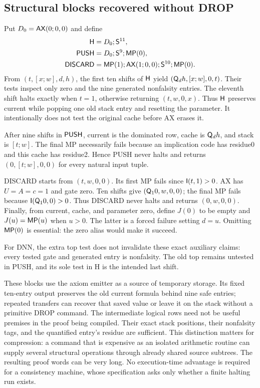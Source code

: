 \subsection{Structural blocks recovered without DROP}

Put $D_0=\mathsf{AX}(0;0,0)$ and define
\begin{align*}
 \mathsf H&=D_0;\mathsf S^{11},\\
 \mathsf{PUSH}&=D_0;\mathsf S^9;\mathsf{MP}(0),\\
 \mathsf{DISCARD}&=\mathsf{MP}(1);\mathsf{AX}(1;0,0);\mathsf S^{10};\mathsf{MP}(0).
\end{align*}
From $(t,[x;w],d,h)$, the first ten shifts of $\mathsf H$ yield
$(\mathsf Q_dh,[x;w],0,t)$. Their tests inspect only zero and the nine
generated nonfalsity entries. The eleventh shift halts exactly when
$t=1$, otherwise returning $(t,w,0,x)$. Thus $\mathsf H$ preserves
current while popping one old stack entry and resetting the parameter.
It intentionally does not test the original cache before AX erases it.

After nine shifts in $\mathsf{PUSH}$, current is the dominated row,
cache is $\mathsf Q_dh$, and stack is $[t;w]$. The final MP necessarily
fails because an implication code has residue0 and this cache has
residue2. Hence PUSH never halts and returns $(0,[t;w],0,0)$ for
every natural input tuple.

DISCARD starts from $(t,w,0,0)$. Its first MP fails since
$\mathsf I(t,1)>0$. AX has $U=A=c=1$ and gate zero. Ten shifts give
$(\mathsf Q_1 0,w,0,0)$; the final MP fails because
$\mathsf I(\mathsf Q_1 0,0)>0$. Thus DISCARD never halts and returns
$(0,w,0,0)$. Finally, from current, cache, and parameter zero, define
$J(0)$ to be empty and $J(u)=\mathsf{MP}(u)$ when $u>0$. The latter is
a forced failure setting $d=u$. Omitting $\mathsf{MP}(0)$ is essential:
the zero alias would make it succeed.

For DNN, the extra top test does not invalidate these exact auxiliary
claims: every tested gate and generated entry is nonfalsity. The old
top remains untested in PUSH, and its sole test in H is the intended
last shift.

These blocks use the axiom emitter as a source of temporary storage.
Its fixed ten-entry output preserves the old current formula behind nine
safe entries; repeated transfers can recover that saved value or leave
it on the stack without a primitive DROP command. The intermediate
logical rows need not be useful premises in the proof being compiled.
Their exact stack positions, their nonfalsity tags, and the quantified
entry's residue are sufficient. This distinction matters for compression:
a command that is expensive as an isolated arithmetic routine can supply
several structural operations through already shared source subtrees.
The resulting proof words can be very long. No execution-time advantage
is required for a consistency machine, whose specification asks only
whether a finite halting run exists.

